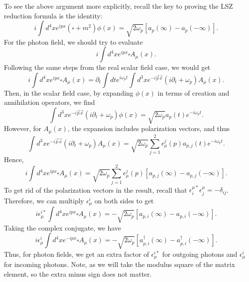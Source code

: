 \documentclass[11pt]{article}
\theoremstyle{definition}
\begin{document}
\begin{tcolorbox}[breakable, colback=yellow!20!white, colframe=black, boxrule=1pt]
To see the above argument more explicitly, recall the key to proving the LSZ reduction formula is the identity:
\begin{equation}
    i\int d^4x e^{ipx}(\square+m^2)\phi(x) = \sqrt{2\omega_p}[a_p(\infty) - a_p(-\infty)].
\end{equation}
For the photon field, we should try to evaluate 
\begin{equation}
    i\int d^4x e^{ipx}\square A_\mu(x).
\end{equation}
Following the same steps from the real scalar field case, we would get
\begin{equation}
    i\int d^4x e^{ipx}\square A_\mu(x) = \partial_t \int dt e^{i\omega_pt} \int d^3x e^{-i\vec{p}\vec{x}}(i\partial_t+ \omega_p) A_\mu(x).
\end{equation}
Then, in the scalar field case, by expanding $\phi(x)$ in terms of creation and annihilation operators, we find
\begin{equation}
    \int d^3x e^{-i\vec{p}\vec{x}}(i\partial_t+ \omega_p) \phi(x) = \sqrt{2\omega_p}a_p(t)e^{-i\omega_pt}.
\end{equation}
However, for $A_\mu(x)$, the expansion includes polarization vectors, and thus
\begin{equation}
    \int d^3x e^{-i\vec{p}\vec{x}}(i\partial_t+ \omega_p) A_\mu(x) = \sqrt{2\omega_p} \sum_{j=1}^2 \epsilon_\mu^j(p) a_{p,j}(t)e^{-i\omega_pt}.
\end{equation}
Hence, 
\begin{equation}
    i\int d^4x e^{ipx}\square A_\mu(x) = \sqrt{2\omega_p} \sum_{j=1}^2 \epsilon_\mu^j(p) [a_{p,j}(\infty) - a_{p,j}(-\infty)].
\end{equation}
To get rid of the polarization vectors in the result, recall that $\epsilon_{i}^{\mu*}\epsilon_j^\mu = -\delta_{ij}$. Therefore, we can multiply $\epsilon_\mu^i$ on both sides to get
\begin{equation}
    i\epsilon_\mu^{i*}\int d^4x e^{ipx}\square A_\mu(x) = -\sqrt{2\omega_p} [a_{p,i}(\infty) - a_{p,i}(-\infty)].
\end{equation}
Taking the complex conjugate, we have
\begin{equation}
    i\epsilon_\mu^{i}\int d^4x e^{-ipx}\square A_\mu(x) = -\sqrt{2\omega_p} [a_{p,i}^\dagger(\infty) - a_{p,i}^\dagger(-\infty)].
\end{equation}
Thus, for photon fields, we get an extra factor of $\epsilon^{i*}_\mu$ for outgoing photons and $\epsilon^{i}_\mu$ for incoming photons. Note, as we will take the modulus square of the matrix element, so the extra minus sign does not matter.
\end{tcolorbox}
\end{document}
